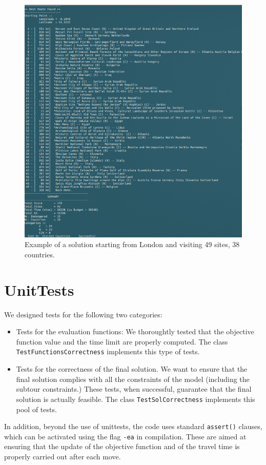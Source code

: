 \documentclass[12pt]{article}
\begin{document}
\begin{figure}[htb]
\centering
\includegraphics[scale=0.995]{example.png}
\caption{Example of a solution starting from London and visiting 49 sites, 38
countries.}
\label{fig:example}
\end{figure}

\section{UnitTests}

We designed tests for the following two categories:
\begin{itemize}
\item Tests for the evaluation functions: We thoroughtly tested that the
objective function value and the time limit are properly computed. The class
\texttt{TestFunctionsCorrectness} implements this type of tests.
\item Tests for the correctness of the final solution. We want to ensure that
the final solution complies with all the constraints of the model (including
the subtour constraints.) These tests, when successful, guarantee that the final
solution is actually feasible. The class \texttt{TestSolCorrectness} implements
this pool of tests.
\end{itemize}
In addition, beyond the use of unittests, the code uses standard
\texttt{assert()} clauses, which can be activated using the flag
\texttt{-ea} in compilation. These are aimed at ensuring that the update of the
objective function and of the travel time is properly carried out after each
move.
\end{document}

